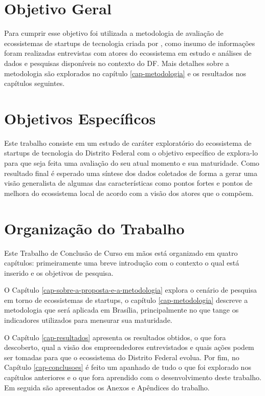 \section{Objetivo Geral}
\label{section:objetivo_geral}

Para cumprir esse objetivo foi utilizada a metodologia de avaliação de ecossistemas de startups de tecnologia criada por , como insumo de informações foram realizadas entrevistas com atores do ecossistema em estudo e análises de dados e pesquisas disponíveis no contexto do DF. Mais detalhes sobre a metodologia são explorados no capítulo \ref{cap-metodologia} e os resultados nos capítulos seguintes.

\section{Objetivos Específicos}
\label{section:objetivos_especificos}

Este trabalho consiste em um estudo de caráter exploratório do ecossistema de startups de tecnologia do Distrito Federal com o objetivo específico de explora-lo para que seja feita uma avaliação do seu atual momento e sua maturidade. Como resultado final é esperado uma síntese dos dados coletados de forma a gerar uma visão generalista de algumas das características como pontos fortes e pontos de melhora do ecossistema local de acordo com a visão dos atores que o compõem. 

\section{Organização do Trabalho}
\label{section:organizacao_do_trabalho}

Este Trabalho de Conclusão de Curso em mãos está organizado em quatro capítulos: primeiramente uma breve introdução com o contexto o qual está inserido e os objetivos de pesquisa.

O Capítulo \ref{cap-sobre-a-proposta-e-a-metodologia} explora o cenário de pesquisa em torno de ecossistemas de startups, o capítulo \ref{cap-metodologia} descreve a metodologia que será aplicada em Brasília, principalmente no que tange os indicadores utilizados para mensurar sua maturidade.

O Capítulo \ref{cap-resultados} apresenta os resultados obtidos, o que fora descoberto, qual a visão dos empreendedores entrevistados e quais ações podem ser tomadas para que o ecossistema do Distrito Federal evolua. Por fim, no Capítulo \ref{cap-conclusoes} é feito um apanhado de tudo o que foi explorado nos capítulos anteriores e o que fora aprendido com o desenvolvimento deste trabalho. Em seguida são apresentados os Anexos e Apêndices do trabalho.
